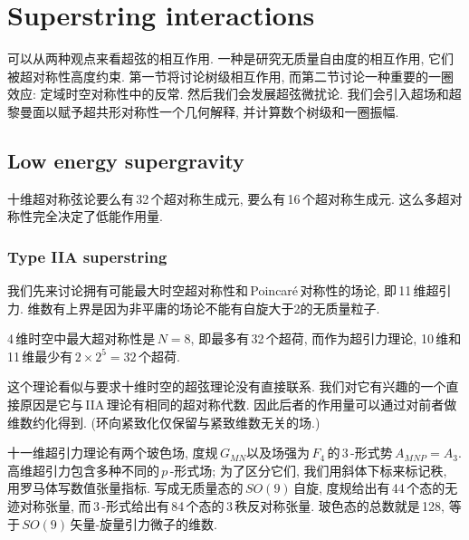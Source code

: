 
\chapter{Superstring interactions}

可以从两种观点来看超弦的相互作用. 一种是研究无质量自由度的相互作用, 它们被超对称性高度约束. 第一节将讨论树级相互作用, 而第二节讨论一种重要的一圈效应: 定域时空对称性中的反常. 然后我们会发展超弦微扰论. 我们会引入超场和超黎曼面以赋予超共形对称性一个几何解释, 并计算数个树级和一圈振幅.

\section{Low energy supergravity}

十维超对称弦论要么有\,32\,个超对称生成元, 要么有\,16\,个超对称生成元. 这么多超对称性完全决定了低能作用量.

\subsection*{Type IIA superstring}

我们先来讨论拥有可能最大时空超对称性和\,Poincar\'{e}\,对称性的场论, 即\,11\,维超引力. 维数有上界是因为非平庸的场论不能有自旋大于2的无质量粒子.

\begin{tcolorbox}
    4\,维时空中最大超对称性是$\,N=8$, 即最多有\,32\,个超荷, 而作为超引力理论, 10\,维和11\,维最少有$\,2\times 2^{5}=32\,$个超荷.
\end{tcolorbox}

这个理论看似与要求十维时空的超弦理论没有直接联系. 我们对它有兴趣的一个直接原因是它与\,IIA\,理论有相同的超对称代数. 因此后者的作用量可以通过对前者做维数约化得到. (环向紧致化仅保留与紧致维数无关的场.)

十一维超引力理论有两个玻色场, 度规$\,G_{MN}$以及场强为$\,F_{\textit{4}}\,$的\,3\,-形式势$\,A_{MNP}=A_{\textit{3}}$. 高维超引力包含多种不同的$\,p\,$-形式场; 为了区分它们, 我们用斜体下标来标记秩, 用罗马体写数值张量指标. 写成无质量态的$\,SO(9)\,$自旋, 度规给出有\,44\,个态的无迹对称张量, 而\,3\,-形式给出有\,84\,个态的\,3\,秩反对称张量. 玻色态的总数就是\,128, 等于$\,SO(9)\,$矢量-旋量引力微子的维数.

